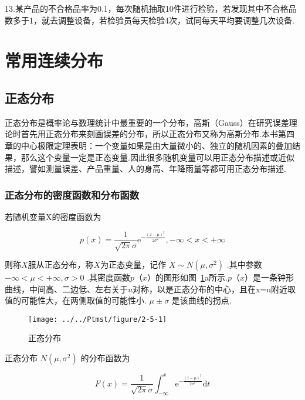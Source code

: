13.某产品的不合格品率为0.1，每次随机抽取10件进行检验，若发现其中不合格品数多于1，就去调整设备，若检验员每天检验4次，试同每天平均要调整几次设备.

\section{常用连续分布}

\subsection{正态分布}

正态分布是概率论与数理统计中最重要的一个分布，高斯（Gauss）在研究误差理论时首先用正态分布来刻画误差的分布，所以正态分布又称为高斯分布.本书第四章的中心极限定理表明：一个变量如果是由大量微小的、独立的随机因素的叠加结果，那么这个变量一定是正态变量.因此很多随机变量可以用正态分布描述或近似描述，譬如测量误差、产品重量、人的身高、年降雨量等都可用正态分布描述.

\subsubsection{正态分布的密度函数和分布函数}

若随机变量X的密度函数为

\begin{equation}
p(x)=\frac{1}{\sqrt{2 \pi} \sigma} \mathrm{e}^{-\frac{(x-\mu)^{2}}{2 \sigma^{2}}},-\infty<x<+\infty \label{eq:2.5.1}
\end{equation}

则称$ X $服从正态分布，称$ X $为正态变量，记作 $X \sim N\left(\mu, \sigma^{2}\right)$ .其中参数 $-\infty< \mu<+\infty, \sigma>0 $ .其密度函数$ p（x） $的图形如图~\ref{fig:2-5-1}a所示.$ p（x） $是一条钟形曲线，中间高、二边低、左右关于$ u $对称，以是正态分布的中心，且在x=u附近取值的可能性大，在两侧取值的可能性小. $\mu \pm \sigma$ 是该曲线的拐点.

\begin{figure}
	\centering
	\texttt{[image: ../../Ptmst/figure/2-5-1]}
	\caption{正态分布}
	\label{fig:2-5-1}
\end{figure}

正态分布 $N\left(\mu, \sigma^{2}\right)$ 的分布函数为

\begin{equation}
F(x)=\frac{1}{\sqrt{2 \pi} \sigma} \int_{-\infty}^{x} \mathrm{e}^{-\frac{(t-\mu)^{2}}{2 \sigma^{2}}} \mathrm{d} t \label{eq:2.5.2}
\end{equation}

